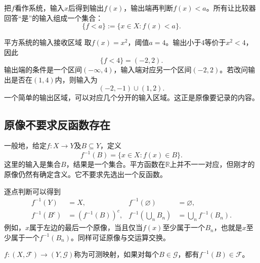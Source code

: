 把$f$看作系统，输入$x$后得到输出$f(x)$，输出端再判断$f(x)<a$。所有让比较器回答“是”的输入组成一个集合：
\[
 \{f<a\}:=\{x\in X:f(x)<a\}.
\]
\begin{center}
\end{center}

\begin{bookexample}{平方系统的输入接收区域}
取$f(x)=x^2$，阈值$a=4$。输出小于$4$等价于$x^2<4$，因此
\[
 \{f<4\}=(-2,2).
\]
输出端的条件是一个区间$(-\infty,4)$，输入端对应另一个区间$(-2,2)$。若改问输出是否在$(1,4)$内，则输入为
\[
 (-2,-1)\cup(1,2).
\]
一个简单的输出区域，可以对应几个分开的输入区域。这正是原像要记录的内容。
\end{bookexample}

\subsection{原像不要求反函数存在}

一般地，给定$f:X\to Y$及$B\subseteq Y$，定义
\[
 f^{-1}(B)=\{x\in X:f(x)\in B\}.
\]
这里的输入是集合$B$，结果是一个集合。平方函数在$\mathbb R$上并不一一对应，但刚才的原像仍然有确定含义。它不要求先选出一个反函数。

逐点判断可以得到
\[
\begin{aligned}
 f^{-1}(Y)&=X,&f^{-1}(\varnothing)&=\varnothing,\\
 f^{-1}(B^c)&=(f^{-1}(B))^c,&
 f^{-1}\left(\bigcup_n B_n\right)&=\bigcup_n f^{-1}(B_n).
\end{aligned}
\]
例如，$x$属于左边的最后一个原像，当且仅当$f(x)$至少属于一个$B_n$，也就是$x$至少属于一个$f^{-1}(B_n)$。同样可证原像与交运算交换。

\begin{definition}[可测映射]
$f:(X,\mathcal F)\to(Y,\mathcal G)$称为可测映射，如果对每个$B\in\mathcal G$，都有$f^{-1}(B)\in\mathcal F$。
\end{definition}

